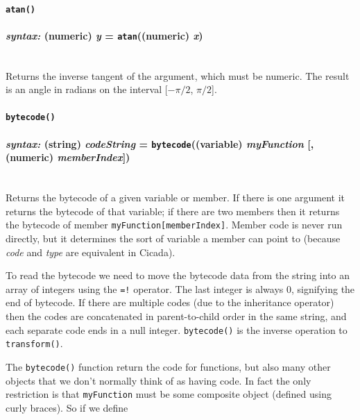 \documentclass{article}
\begin{document}





\paragraph{\texttt{atan()}\\\\
\normalfont \emph{syntax: } (numeric) \emph{y} = \texttt{atan}((numeric) \emph{x})\\\\}

Returns the inverse tangent of the argument, which must be numeric.  The result is an angle in radians on the interval [$-\pi/2$, $\pi/2$].\\







\paragraph{\texttt{bytecode()}\\\\
\normalfont \emph{syntax: } (string) \emph{codeString} = \texttt{bytecode}((variable) \emph{myFunction} [, (numeric) \emph{memberIndex}])\\\\}

Returns the bytecode of a given variable or member.  If there is one argument it returns the bytecode of that variable; if there are two members then it returns the bytecode of member \verb#myFunction[memberIndex]#.  Member code is never run directly, but it determines the sort of variable a member can point to (because \emph{code} and \emph{type} are equivalent in Cicada).

To read the bytecode we need to move the bytecode data from the string into an array of integers using the \verb#=!# operator.  The last integer is always 0, signifying the end of bytecode.  If there are multiple codes (due to the inheritance operator) then the codes are concatenated in parent-to-child order in the same string, and each separate code ends in a null integer.  \texttt{bytecode()} is the inverse operation to \texttt{transform()}.

The \verb#bytecode()# function return the code for functions, but also many other objects that we don't normally think of as having code.  In fact the only restriction is that \verb#myFunction# must be some composite object (defined using curly braces).  So if we define
\end{document}
